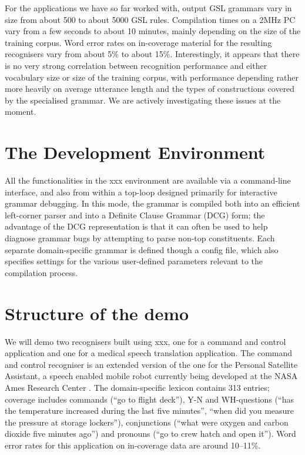 \documentclass[11pt,twoside]{article}
\begin{document}
For the applications we have so far worked with, output GSL grammars
vary in size from about 500 to about 5000 GSL rules. Compilation times
on a 2MHz PC vary from a few seconds to about 10 minutes, mainly
depending on the size of the training corpus. Word error rates on
in-coverage material for the resulting recognisers vary from about 5\%
to about 15\%.  Interestingly, it appears that there is no very strong
correlation between recognition performance and either vocabulary size
or size of the training corpus, with performance depending rather more
heavily on average utterance length and the types of constructions
covered by the specialised grammar. We are actively investigating
these issues at the moment.

\section{The Development Environment}
\label{Section:DevelopmentEnvironment}

All the functionalities in the {\sc xxx} environment are available via a
command-line interface, and also from within a top-loop designed primarily
for interactive grammar debugging. In this mode, the grammar is compiled
both into an efficient left-corner parser and into a Definite Clause Grammar (DCG)
form; the advantage of the DCG representation is that it can often be
used to help diagnose grammar bugs by attempting to parse non-top
constituents. Each separate domain-specific grammar is defined though
a config file, which also specifies settings for the various user-defined
parameters relevant to the compilation process.

\section{Structure of the demo}
\label{Section:Demo}

We will demo two recognisers built using {\sc xxx}, one for a command
and control application and one for a medical speech translation
application. The command and control recogniser is an extended version of
the one for the Personal Satellite Assistant, a speech enabled mobile robot 
currently being developed at the NASA Ames Research Center \cite{PSA}.
The domain-specific lexicon contains 313 entries; coverage includes
commands (``go to flight deck''), Y-N and WH-questions (``has the temperature
increased during the last five minutes'', ``when did you measure the pressure
at storage lockers''), conjunctions (``what were oxygen and carbon dioxide
five minutes ago'') and pronouns (``go to crew hatch and open it'').
Word error rates for this application on in-coverage data are around
10--11\%.
\end{document}
